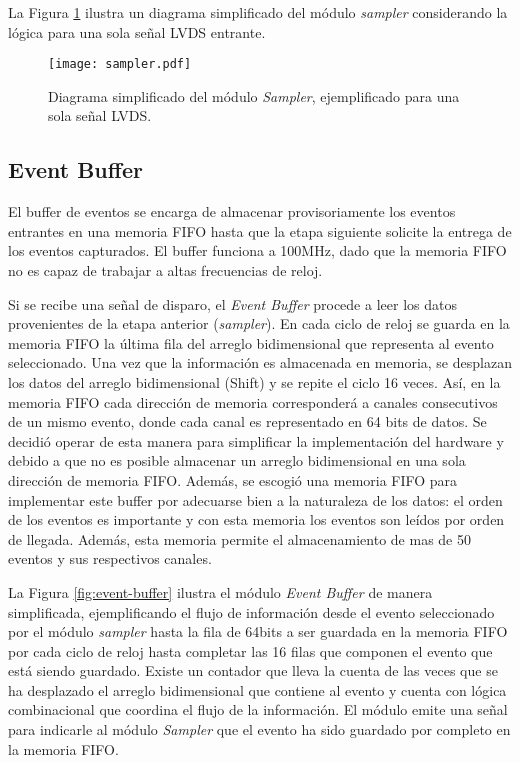 	La Figura \ref{fig:sampler} ilustra un diagrama simplificado del módulo \textit{sampler} considerando la lógica para una sola señal LVDS entrante. 
	
	\begin{figure}[H]
		\centering
		\texttt{[image: sampler.pdf]}
		\caption{Diagrama simplificado del módulo \textit{Sampler}, ejemplificado para una sola señal LVDS.}
		\label{fig:sampler}
	\end{figure}
	
	
	\subsection{Event Buffer}
	\label{sec:buffer}
	
	El buffer de eventos se encarga de almacenar provisoriamente los eventos entrantes en una memoria FIFO hasta que la etapa siguiente solicite la entrega de los eventos capturados. El buffer funciona a 100MHz, dado que la memoria FIFO no es capaz de trabajar a altas frecuencias de reloj.
	
	Si se recibe una señal de disparo, el \textit{Event Buffer} procede a leer los datos provenientes de la etapa anterior (\textit{sampler}). En cada ciclo de reloj se guarda en la memoria FIFO la última fila del arreglo bidimensional que representa al evento seleccionado. Una vez que la información es almacenada en memoria, se desplazan los datos del arreglo bidimensional (Shift) y se repite el ciclo 16 veces. Así, en la memoria FIFO cada dirección de memoria corresponderá a canales consecutivos de un mismo evento, donde cada canal es representado en 64 bits de datos. Se decidió operar de esta manera para simplificar la implementación del hardware y debido a que no es posible almacenar un arreglo bidimensional en una sola dirección de memoria FIFO. Además, se escogió una memoria FIFO para implementar este buffer por adecuarse bien a la naturaleza de los datos: el orden de los eventos es importante y con esta memoria los eventos son leídos por orden de llegada. Además, esta memoria permite el almacenamiento de mas de 50 eventos y sus respectivos canales.
	
	La Figura \ref{fig:event-buffer} ilustra el módulo \textit{Event Buffer} de manera simplificada, ejemplificando el flujo de información desde el evento seleccionado por el módulo \textit{sampler} hasta la fila de 64bits a ser guardada en la memoria FIFO por cada ciclo de reloj hasta completar las 16 filas que componen el evento que está siendo guardado. Existe un contador que lleva la cuenta de las veces que se ha desplazado el arreglo bidimensional que contiene al evento y cuenta con lógica combinacional que coordina el flujo de la información. El módulo emite una señal para indicarle al módulo \textit{Sampler} que el evento ha sido guardado por completo en la memoria FIFO.
	
